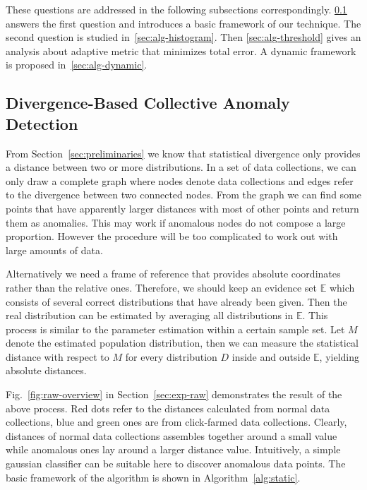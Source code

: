 \documentclass[10pt,conference,letterpaper]{IEEEtran}
\begin{document}
		These questions are addressed in the following subsections correspondingly.
		\ref{sec:alg-basic} answers the first question and introduces a basic framework of our technique. The second question is studied in~\ref{sec:alg-histogram}. Then \ref{sec:alg-threshold} gives an analysis about adaptive metric that minimizes total error. A dynamic framework is proposed in~\ref{sec:alg-dynamic}.
	
		\subsection{Divergence-Based Collective Anomaly Detection}\label{sec:alg-basic}
			From Section~\ref{sec:preliminaries} we know that statistical divergence only provides a distance between two or more distributions. In a set of data collections, we can only draw a complete graph where nodes denote data collections and edges refer to the divergence between two connected nodes. From the graph we can find some points that have apparently larger distances with most of other points and return them as anomalies. This may work if anomalous nodes do not compose a large proportion. However the procedure will be too complicated to work out with large amounts of data. 
	
			Alternatively we need a frame of reference that provides absolute coordinates rather than the relative ones. Therefore, we should keep an evidence set $\mathbb{E}$ which consists of several correct distributions that have already been given. Then the real distribution can be estimated by averaging all distributions in $\mathbb{E}$. This process is similar to the parameter estimation within a certain sample set. Let $M$ denote the estimated population distribution, then we can measure the statistical distance with respect to $M$ for every distribution $D$ inside and outside $\mathbb{E}$, yielding absolute distances. 
			
			Fig.~\ref{fig:raw-overview} in Section~\ref{sec:exp-raw} demonstrates the result of the above process. Red dots refer to the distances calculated from normal data collections, blue and green ones are from click-farmed data collections. Clearly, distances of normal data collections assembles together around a small value while anomalous ones lay around a larger distance value. Intuitively, a simple gaussian classifier can be suitable here to discover anomalous data points. The basic framework of the algorithm is shown in Algorithm~\ref{alg:static}.
	
\end{document}
